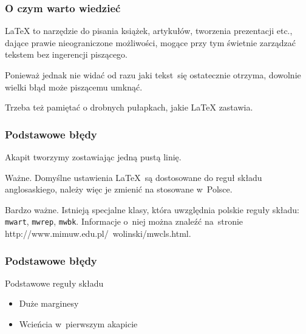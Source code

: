 \documentclass[10pt,t]{beamer}
\begin{document}
\begin{frame}
  \frametitle{O czym warto wiedzieć}

  \LaTeX{} to narzędzie do pisania książek, artykułów, tworzenia
  prezentacji etc., dające prawie nieograniczone możliwości,
  mogące przy tym świetnie zarządzać tekstem bez ingerencji piszącego.

  Ponieważ jednak nie widać od razu jaki tekst~się ostatecznie otrzyma,
  dowolnie wielki błąd może piszącemu umknąć.

  Trzeba też pamiętać o drobnych pułapkach, jakie \LaTeX{} zastawia.

\end{frame}





\begin{frame}
  \frametitle{Podstawowe błędy}


  Akapit tworzymy zostawiając jedną pustą linię.

  Ważne. Domyślne ustawienia \LaTeX{}~są dostosowane do reguł składu
  anglosaskiego, należy więc je zmienić na stosowane w~Polsce.

  Bardzo ważne.  Istnieją specjalne klasy, która uwzględnia polskie reguły
  składu: \texttt{mwart}, \texttt{mwrep}, \texttt{mwbk}. Informacje o~niej
  można znaleźć na~stronie
  {http://www.mimuw.edu.pl/~wolinski/mwcls.html}.

\end{frame}





\begin{frame}
  \frametitle{Podstawowe błędy}


  Podstawowe reguły składu
  \begin{itemize}
    \RaggedRight

  \item Duże marginesy %

  \item Wcieńcia w~pierwszym akapicie

  \end{itemize}

\end{frame}
\end{document}
